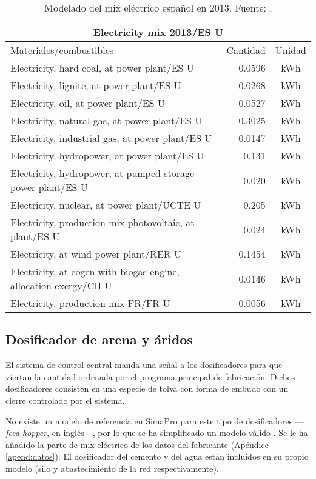 \begin{table}[!htb]
\centering
\begin{tabular}{p{8cm}rc}
\toprule
\multicolumn{3}{c}{Electricity mix 2013/ES U}\\
\midrule
Materiales/combustibles & Cantidad & Unidad\\
\midrule
Electricity, hard coal, at power plant/ES U & 0.0596 & \si{kWh}\\
Electricity, lignite, at power plant/ES U & 0.0268 & \si{kWh}\\
Electricity, oil, at power plant/ES U & 0.0527 & \si{kWh}\\
Electricity, natural gas, at power plant/ES U & 0.3025 & \si{kWh}\\
Electricity, industrial gas, at power plant/ES U & 0.0147 & \si{kWh}\\
Electricity, hydropower, at power plant/ES U & 0.131 & \si{kWh}\\
Electricity, hydropower, at pumped storage power plant/ES U & 0.020 & \si{kWh}\\
Electricity, nuclear, at power plant/UCTE U & 0.205 & \si{kWh}\\
Electricity, production mix photovoltaic, at plant/ES U & 0.024 & \si{kWh}\\
Electricity, at wind power plant/RER U & 0.1454 & \si{kWh}\\
Electricity, at cogen with biogas engine, allocation exergy/CH U & 0.0146 & \si{kWh}\\
Electricity, production mix FR/FR U & 0.0056 & \si{kWh}\\
\bottomrule
\end{tabular}
\caption[Modelado del mix eléctrico español en 2013.]{Modelado del mix eléctrico español en 2013. Fuente: \cite{mlgceballos}.}
\label{modeladomixelectrico}
\end{table}

\subsection{Dosificador de arena y áridos}

El sistema de control central manda una señal a los dosificadores para que viertan la cantidad ordenada por el programa principal de fabricación. Dichos dosificadores consisten en una especie de tolva con forma de embudo con un cierre controlado por el sistema.

No existe un modelo de referencia en SimaPro para este tipo de dosificadores —\textit{feed hopper}, en inglés—, por lo que se ha simplificado un modelo válido \cite{woodpellet}. Se le ha añadido la parte de mix eléctrico de los datos del fabricante (Apéndice \ref{apend:datos}). El dosificador del cemento y del agua están incluidos en su propio modelo (silo y abastecimiento de la red respectivamente).

